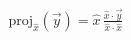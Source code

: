 \documentclass[preview]{standalone}
\begin{document}
\begin{align*}
\mathrm{proj}_{\hat{x}}(\overrightarrow{y}) = \hat{x}\, \frac{\hat{x}\cdot\overrightarrow{y}}{\hat{x}\cdot\hat{x}}
\end{align*}
\end{document}
